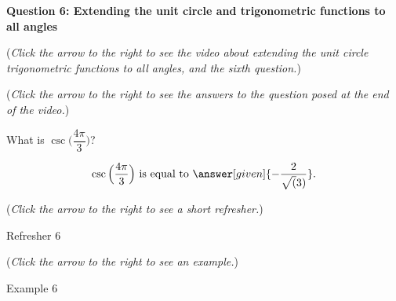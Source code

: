 \documentclass{ximera}
\begin{document}
\textbf{Question 6: Extending the unit circle and trigonometric
functions to all angles}
\begin{question}
\begin{flushright}
{\color{blue}(\emph{Click the arrow to the right to see
the video about extending the unit circle trigonometric
functions to all angles, and the sixth question.})}
\end{flushright}
\begin{center}
\begin{expandable}
{\color{blue}(\emph{Click the arrow to the right to see the answers 
to the question posed at the end of the video.})}
\begin{expandable}
What is $\csc\Big(\dfrac{4\pi}{3}\Big)$?
\begin{prompt}
\[
\csc\Big( \dfrac{4\pi}{3}\Big) \text{ is equal to } \answer[given]{-\frac{2}{\sqrt(3)}}.
\]
\end{prompt}
\begin{flushright}
{\color{blue}(\emph{Click the arrow to the right to see a short refresher.})}
\end{flushright}
\begin{expandable}
Refresher 6
\end{expandable}
\begin{flushright}
{\color{blue}(\emph{Click the arrow to the right to see an example.})}
\end{flushright}
\begin{expandable}
Example 6
\end{expandable}
\end{expandable}
\end{expandable}
\end{center}
\end{question}
\end{document}
